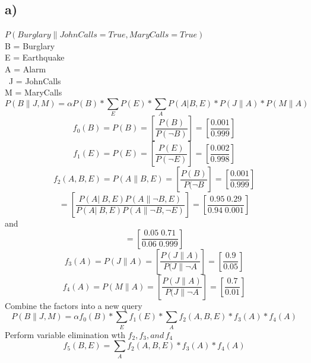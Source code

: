 \documentclass[11pt]{article} %
\begin{document}
\subsection*{a)}
$P(Burglary \| JohnCalls = True, MaryCalls = True)$ \\
B = Burglary\\
E = Earthquake\\
A = Alarm\\\
J = JohnCalls\\
M = MaryCalls\\
\begin{equation}
P(B \| J, M) = \alpha P(B) * \sum_{E} P(E) *  \sum_{A} P(A | B, E) * P(J \| A) * P(M \| A)
\end{equation}
\begin{equation}
f_0(B) = P(B) = [\frac{P(B)}{P(\neg B)}] = [\frac{0.001}{0.999}]
\end{equation}
\begin{equation}
f_1(E) = P(E) = [\frac{P(E)}{P(\neg E)}] = [\frac{0.002}{0.998}]
\end{equation}
\begin{equation}
f_2(A, B, E) = P(A \| B, E) = [\frac{P(B)}{P(\neg B}] = [\frac{0.001}{0.999}]
\end{equation}
\begin{equation}
= [\frac{P(A |\ B, E) P(A \| \neg B, E)}{P(A |\ B, E) P(A \| \neg B, \neg E)}]  = [\frac{0.95\;0.29}{0.94\;0.001}]
\end{equation}
and\\
\begin{equation}
[\frac{P(\neg A |\ B, E) P(\neg A \| \neg B, E)}{P(\neg A |\ B, E) P(\neg A \| \neg B, \neg E)}]  = [\frac{0.05\;0.71}{0.06\;0.999}]
\end{equation}
\begin{equation}
f_3(A) = P(J\| A) = [\frac{P(J \| A)}{P(J \| \neg A}] = [\frac{0.9}{0.05}]
\end{equation}
\begin{equation}
f_4(A) = P(M\| A) = [\frac{P(J \| A)}{P(J \| \neg A}] = [\frac{0.7}{0.01}]
\end{equation}
Combine the factors into a new query
\begin{equation}
P(B \| J, M) = \alpha f_0(B) * \sum_{E} f_1(E) *  \sum_{A} f_2(A, B, E) * f_3(A) * f_4(A)
\end{equation}
Perform variable elimination wth $f_2, f_3, and\, f_4$
\begin{equation}
f_5(B, E) = \sum_{A} f_2(A, B, E) * f_3(A) * f_4(A)
\end{equation}
\end{document}
